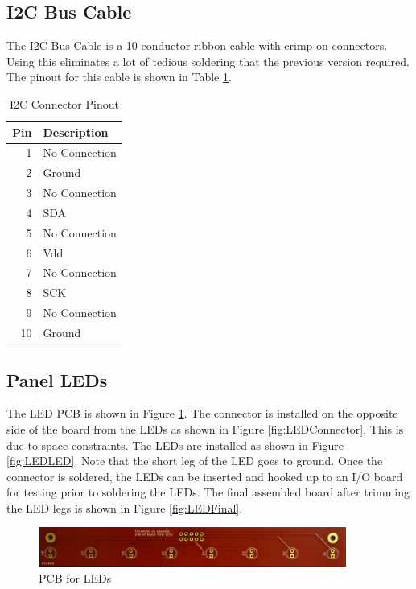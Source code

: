 \documentclass[10pt, openany]{book}
\begin{document}
\subsection{I2C Bus Cable}
The I2C Bus Cable is a 10 conductor ribbon cable with crimp-on connectors.  Using this eliminates a lot of tedious soldering that the previous version required.  The pinout for this cable is shown in Table \ref{tbl:I2C-Pins}.

\begin{table}
  \label{tbl:I2C-Pins}
  \caption{I2C Connector Pinout}
  \centering
  \begin{tabular}{|r|l|}
    \hline
    Pin & Description\\
    \hline
    1 & No Connection\\
    2 & Ground\\
    3 & No Connection\\
    4 & SDA\\
    5 & No Connection\\
    6 & Vdd\\
    7 & No Connection\\
    8 & SCK\\
    9 & No Connection\\
    10 & Ground\\
    \hline
  \end{tabular}
\end{table}

\clearpage
\subsection{Panel LEDs}
\label{subsec:PanelLED}
The LED PCB is shown in Figure \ref{fig:LEDPCB}.  The connector is installed on the opposite side of the board from the LEDs as shown in Figure \ref{fig:LEDConnector}.  This is due to space constraints.  The LEDs are installed as shown in Figure \ref{fig:LEDLED}.  Note that the short leg of the LED goes to ground.  Once the connector is soldered, the LEDs can be inserted and hooked up to an I/O board for testing prior to soldering the LEDs.  The final assembled board after trimming the LED legs is shown in Figure \ref{fig:LEDFinal}.

\begin{figure}[ht!]
  \centering
  \includegraphics[width=0.9\textwidth]{../Pict/LED-Board.jpg}
  \caption{PCB for LEDs}
  \label{fig:LEDPCB}
\end{figure}
\end{document}
